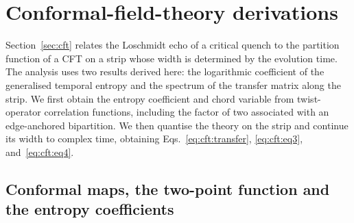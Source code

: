 \appendix
{}

\FloatBarrier
\section{Conformal-field-theory derivations}
\label{app:cft}

Section~\ref{sec:cft} relates the Loschmidt echo of a critical quench to the partition function of a \ac{CFT} on a strip whose width is determined by the evolution time. The analysis uses two results derived here: the logarithmic coefficient of the generalised temporal entropy and the spectrum of the transfer matrix along the strip. We first obtain the entropy coefficient and chord variable from twist-operator correlation functions, including the factor of two associated with an edge-anchored bipartition. We then quantise the theory on the strip and continue its width to complex time, obtaining Eqs.~\eqref{eq:cft:transfer}, \eqref{eq:cft:eq3}, and~\eqref{eq:cft:eq4}.

\subsection{Conformal maps, the two-point function and the entropy coefficients}
\label{app:cft:maps}

